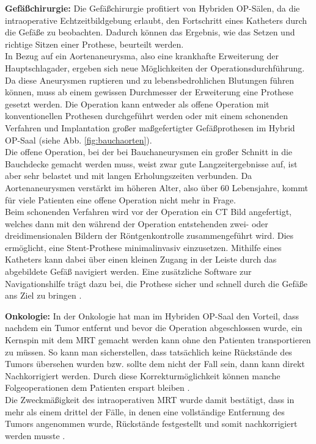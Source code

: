 \textbf{Gefäßchirurgie:}
Die Gefäßchirurgie profitiert von Hybriden OP-Sälen, da die intraoperative Echtzeitbildgebung erlaubt, den Fortschritt eines Katheters durch die Gefäße zu beobachten. Dadurch können das Ergebnis, wie das Setzen und richtige Sitzen einer Prothese, beurteilt werden.\\
In Bezug auf ein Aortenaneurysma, also eine krankhafte Erweiterung der Hauptschlagader, ergeben sich neue Möglichkeiten der Operationsdurchführung. Da diese Aneurysmen ruptieren und zu lebensbedrohlichen Blutungen führen können, muss ab einem gewissen Durchmesser der Erweiterung eine Prothese gesetzt werden. Die Operation kann entweder als offene Operation mit konventionellen Prothesen durchgeführt werden oder mit einem schonenden Verfahren und Implantation großer maßgefertigter Gefäßprothesen im Hybrid OP-Saal (siehe Abb. \ref{fig:bauchaorten}). \\
Die offene Operation, bei der bei Bauchaneurysmen ein großer Schnitt in die Bauchdecke gemacht werden muss, weist zwar gute Langzeitergebnisse auf, ist aber sehr belastet und mit langen Erholungszeiten verbunden. Da Aortenaneurysmen verstärkt im höheren Alter, also über 60 Lebensjahre, kommt für viele Patienten eine offene Operation nicht mehr in Frage. \\
Beim schonenden Verfahren wird vor der Operation ein CT Bild angefertigt, welches dann mit den während der Operation entstehenden zwei- oder dreidimensionalen Bildern der Röntgenkontrolle zusammengeführt wird. Dies ermöglicht, eine Stent-Prothese minimalinvasiv einzusetzen. Mithilfe eines Katheters kann dabei über einen kleinen Zugang in der Leiste durch das abgebildete Gefäß navigiert werden. Eine zusätzliche Software zur Navigationshilfe trägt dazu bei, die Prothese sicher und schnell durch die Gefäße ans Ziel zu bringen \cite{Aortenaneurysma,DresdnerUniklinikum,TickendeBombeImBauch}.

\textbf{Onkologie:}
In der Onkologie hat man im Hybriden OP-Saal den Vorteil, dass nachdem ein Tumor entfernt und bevor die Operation abgeschlossen wurde, ein Kernspin mit dem MRT gemacht werden kann ohne den Patienten transportieren zu müssen. So kann man sicherstellen, dass tatsächlich keine Rückstände des Tumors übersehen wurden bzw. sollte dem nicht der Fall sein, dann kann direkt Nachkorrigiert werden. Durch diese Korrekturmöglichkeit können manche Folgeoperationen dem Patienten erspart bleiben \cite{AerzteZeitung}.\\
Die Zweckmäßigkeit des intraoperativen MRT wurde damit bestätigt, dass in mehr als einem drittel der Fälle, in denen eine vollständige Entfernung des Tumors angenommen wurde, Rückstände festgestellt und somit nachkorrigiert werden musste \cite{BrainShiftInTumorResection}.

